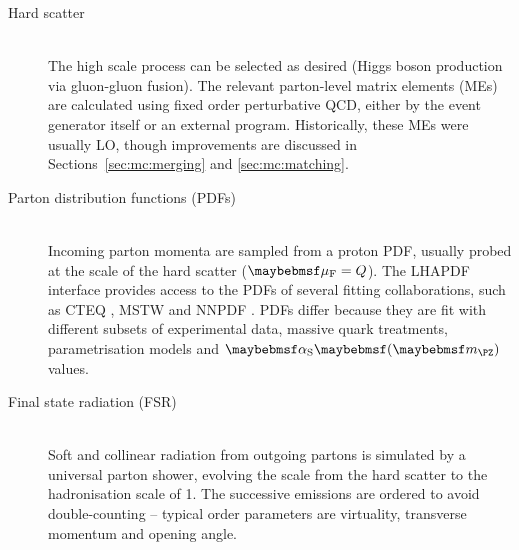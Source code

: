 \begin{description}
\item[Hard scatter] \hfill \\
	The high scale process can be selected as desired (\eg Higgs boson production via 
	gluon-gluon fusion). The relevant parton-level matrix elements (MEs) are calculated 
	using fixed order perturbative QCD, either by the event generator itself or an 
	external program. Historically, these MEs were usually LO, though improvements are 
	discussed in Sections~\ref{sec:mc:merging} and \ref{sec:mc:matching}.
\item[Parton distribution functions (PDFs)] \hfill \\
	Incoming parton momenta are sampled from a proton PDF, usually probed at the 
	scale of the hard scatter ($\muf = Q$). The LHAPDF interface \cite{LHAPDF} provides 
	access to the PDFs of several fitting collaborations, such as CTEQ \cite{CTEQ}, 
	MSTW \cite{MSTW} and NNPDF \cite{NNPDF}. PDFs differ because they are fit with 
	different subsets of experimental data, massive quark treatments, parametrisation 
	models and $\alphaS \parenths{\mZ}$ values.
\item[Final state radiation (FSR)] \hfill \\
	Soft and collinear radiation from outgoing partons is simulated by a universal parton 
	shower, evolving the scale from the hard scatter to the hadronisation scale of 
	\about\unit{1}{\GeV}. The successive emissions are ordered to avoid double-counting --
	typical order parameters are virtuality, transverse momentum and opening angle.


\end{description}
